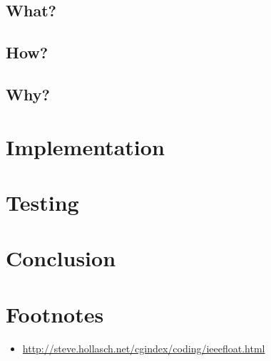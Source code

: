 \documentclass[11pt]{article}
\begin{document}
\subsection{What?}
\subsection{How?}
\subsection{Why?}
\section{Implementation}

\section{Testing}



\section{Conclusion}

\section*{Footnotes}
\begin{itemize}
\item \url{http://steve.hollasch.net/cgindex/coding/ieeefloat.html}
\end{itemize}
\appendix
\begin{appendices}

\end{appendices}
\end{document}
